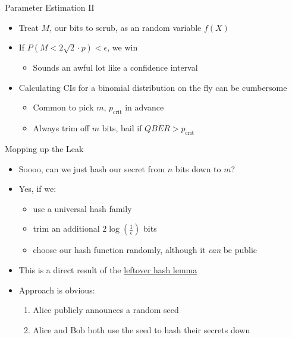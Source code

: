 \documentclass[pdf]{beamer}
\begin{document}
\begin{frame}{Parameter Estimation II}
  \begin{itemize}
  \item Treat $M$, our bits to scrub, as an random variable $f(X)$
  \pause\item If $P(M < 2\sqrt{2} \cdot p) < \epsilon$, we win
    \begin{itemize}
    \item Sounds an awful lot like a confidence interval
    \end{itemize}
  \pause\item Calculating CIs for a binomial distribution on the fly can be cumbersome
    \begin{itemize}
    \item Common to pick $m$, $p_\text{crit}$ in advance
    \item Always trim off $m$ bits, bail if $QBER > p_\text{crit}$
    \end{itemize}
  \end{itemize}
\end{frame}
\begin{frame}{Mopping up the Leak}
  \begin{itemize}
  \item Soooo, can we just hash our secret from $n$ bits down to $m$?
  \pause\item Yes, if we:
    \begin{itemize}
    \item use a universal hash family
    \item trim an additional $2 \log \left( \frac{1}{\epsilon} \right)$ bits
    \item choose our hash function randomly, although it \emph{can} be public
    \end{itemize}
  \pause\item This is a direct result of the
    \underline{\href{https://www.cs.bu.edu/~reyzin/teaching/s11cs937/notes-leo-1.pdf}{leftover
        hash lemma}}
  \pause\item Approach is obvious:
    \begin{enumerate}
    \item Alice publicly announces a random seed
    \item Alice and Bob both use the seed to hash their secrets down
    \end{enumerate}
  \end{itemize}
\end{frame}
\end{document}

